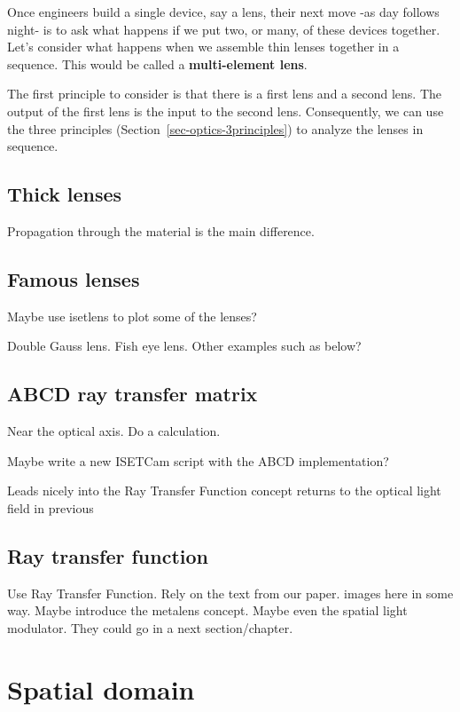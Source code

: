 \documentclass[
  letterpaper,
]{book}
\begin{document}
Once engineers build a single device, say a lens, their next move -as
day follows night- is to ask what happens if we put two, or many, of
these devices together. Let's consider what happens when we assemble
thin lenses together in a sequence. This would be called a
\textbf{multi-element lens}.

The first principle to consider is that there is a first lens and a
second lens. The output of the first lens is the input to the second
lens. Consequently, we can use the three principles
(Section~\ref{sec-optics-3principles}) to analyze the lenses in
sequence.

\section{Thick lenses}\label{thick-lenses}

Propagation through the material is the main difference.

\section{Famous lenses}\label{sec-optics-lenses}

Maybe use isetlens to plot some of the lenses?

Double Gauss lens. Fish eye lens. Other examples such as below?

\section{ABCD ray transfer matrix}\label{sec-optics-abcd}

Near the optical axis. Do a calculation.

Maybe write a new ISETCam script with the ABCD implementation?

Leads nicely into the Ray Transfer Function concept returns to the
optical light field in previous

\section{Ray transfer function}\label{sec-optics-raytransfer}

Use Ray Transfer Function. Rely on the text from our paper. images here
in some way. Maybe introduce the metalens concept. Maybe even the
spatial light modulator. They could go in a next section/chapter.

\chapter{Spatial domain}\label{sec-optics-linear-space}
\end{document}
